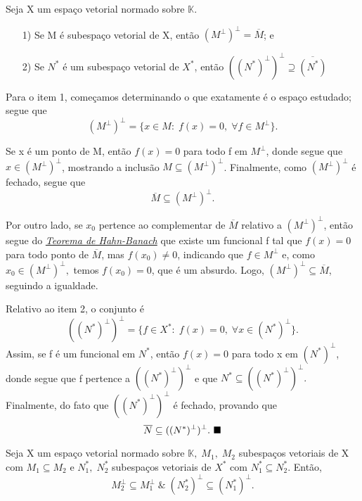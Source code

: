 \documentclass[../functional_analysis.tex]{subfiles}
\begin{document}
\begin{prop*}
	Seja X um espaço vetorial normado sobre \(\mathbb{K}.\)
	\begin{itemize}
		\item[1)] Se M é subespaço vetorial de X, então \((M^{\perp })^{\perp }=\overline{M}\); e
		\item[2)] Se \(N^{*}\) é um subespaço vetorial de \(X^{*}\), então \(((N^{*})^{\perp })^{\perp }\supseteq \overline{(N^{*})}\)
	\end{itemize}
\end{prop*}
\begin{proof*}
	Para o item 1, começamos determinando o que exatamente é o espaço estudado; segue que
	\[
		(M^{\perp })^{\perp }=\{x\in M:\; f(x)=0,\; \forall f\in M^{\perp }\}.
	\]

	Se x é um ponto de M, então \(f(x) = 0\) para todo f em \(M^{\perp }\), donde segue que \(x\in (M^{\perp })^{\perp }\), mostrando a inclusão \(M\subseteq (M^{\perp })^{\perp }\). Finalmente, como \((M^{\perp })^{\perp }\) é fechado, segue que
	\[
		\overline{M}\subseteq (M^{\perp })^{\perp }.
	\]

	Por outro lado, se \(x_{0}\) pertence ao complementar de \(\overline{M}\) relativo a \((M^{\perp })^{\perp }\), então segue do \hyperlink{hahn_banach}{\textit{Teorema de Hahn-Banach}} que existe um funcional f tal que \(f(x)=0\) para todo ponto de \(\overline{M}\), mas \(f(x_{0})\neq 0\), indicando que \(f\in M^{\perp }\) e, como \(x_{0}\in (M^{\perp })^{\perp },\) temos \(f(x_{0})=0\), que é um absurdo. Logo, \((M^{\perp })^{\perp }\subseteq \overline{M}\), seguindo a igualdade.

	Relativo ao item 2, o conjunto é
	\[
		((N^{*})^{\perp })^{\perp }=\{f\in X^{*}:\; f(x)=0,\; \forall x\in (N^{*})^{\perp }\}.
	\]
	Assim, se f é um funcional em \(N^{*}\), então \(f(x)=0\) para todo x em \((N^{*})^{\perp }\), donde segue que f pertence a \(((N^{*})^{\perp })^{\perp }\) e que \(N^{*}\subseteq ((N^{*})^{\perp })^{\perp }.\) Finalmente, do fato que \(((N^{*})^{\perp })^{\perp }\) é fechado, provando que
	\[
		\overline{N}\subseteq ((N^{*})^{\perp })^{\perp }. \text{ $\blacksquare$}
	\]
\end{proof*}
\begin{lemma*}
	Seja X um espaço vetorial normado sobre \(\mathbb{K},\; M_1,\; M_2\) subespaços vetoriais de X com \(M_1 \subseteq M_2\) e \(N_{1}^{*},\; N_{2}^{*}\) subespaços vetoriais de \(X^{*}\) com \(N_{1}^{*}\subseteq N_{2}^{*}.\)
	Então,
	\[
		M_{2}^{\perp }\subseteq M_{1}^{\perp }\;\&\; (N_{2}^{*})^{\perp }\subseteq (N_{1}^{*})^{\perp }.
	\]
\end{lemma*}
\end{document}
